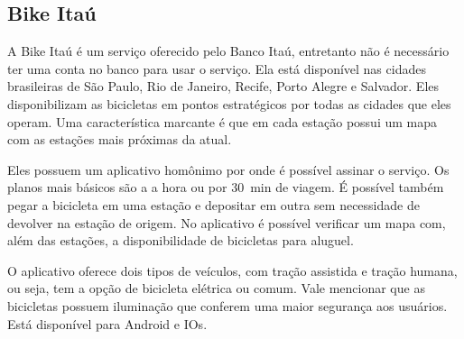 \subsection{Bike Itaú}
\label{sec:itau}

A Bike Itaú é um serviço oferecido pelo Banco Itaú, entretanto não é necessário ter uma conta no banco para usar o serviço. Ela está disponível nas cidades brasileiras de São Paulo, Rio de Janeiro, Recife, Porto Alegre e Salvador. Eles disponibilizam as bicicletas em pontos estratégicos por todas as cidades que eles operam. Uma característica marcante é que em cada estação possui um mapa com as estações mais próximas da atual.

Eles possuem um aplicativo homônimo por onde é possível assinar o serviço. Os planos mais básicos são a  a hora ou  por \SI{30}{\minute} de viagem. É possível também pegar a bicicleta em uma estação e depositar em outra sem necessidade de devolver na estação de origem. No aplicativo é possível verificar um mapa com, além das estações, a disponibilidade de bicicletas para aluguel.

O aplicativo oferece dois tipos de veículos, com tração assistida e tração humana, ou seja, tem a opção de bicicleta elétrica ou comum. Vale mencionar que as bicicletas possuem iluminação que conferem uma maior segurança aos usuários. Está disponível para Android e IOs.

